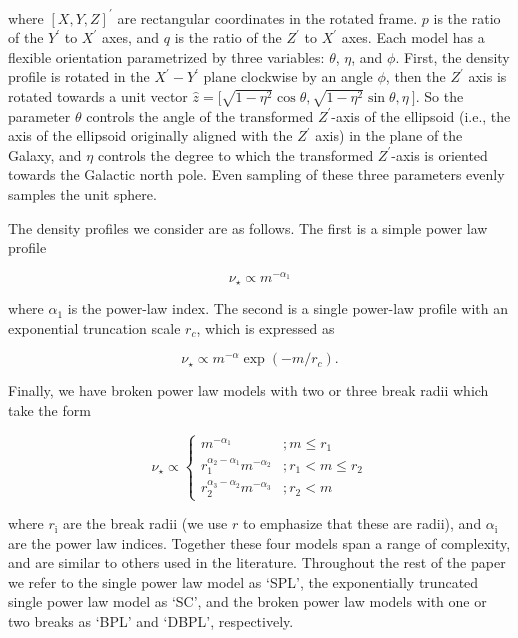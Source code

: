 \noindent where $[X,Y,Z]^{\prime}$ are rectangular coordinates in the rotated frame. $p$ is the ratio of the $Y^{\prime}$ to $X^{\prime}$ axes, and $q$ is the ratio of the $Z^{\prime}$ to $X^{\prime}$ axes. Each model has a flexible orientation parametrized by three variables: $\theta$, $\eta$, and $\phi$. First, the density profile is rotated in the $X^{\prime}-Y^{\prime}$ plane clockwise by an angle $\phi$, then the $Z^{\prime}$ axis is rotated towards a unit vector $\hat{z} = \big[ \sqrt{ 1-\eta^{2} } \cos\theta, \sqrt{ 1-\eta^{2} } \sin\theta, \eta \  \big]$. So the parameter $\theta$ controls the angle of the transformed $Z^{\prime}$-axis of the ellipsoid (i.e., the axis of the ellipsoid originally aligned with the $Z^{\prime}$ axis) in the plane of the Galaxy, and $\eta$ controls the degree to which the transformed $Z^{\prime}$-axis is oriented towards the Galactic north pole. Even sampling of these three parameters evenly samples the unit sphere. 

The density profiles we consider are as follows. The first is a simple power law profile

\begin{equation}
\label{eq:single-power-law}
\nu_{\star} \propto m^{-\alpha_{1}}
\end{equation}

\noindent where $\alpha_{1}$ is the power-law index. The second is a single power-law profile with an exponential truncation scale $r_{c}$, which is expressed as 

\begin{equation}
\label{eq:exp-truncated-power-law}
\nu_{\star} \propto m^{-\alpha} \exp(-m/r_{c}) .
\end{equation}

\noindent Finally, we have broken power law models with two or three break radii which take the form

\begin{equation}
\label{eq:broken-power-law}
\nu_{\star} \propto 
\begin{cases}
m^{-\alpha_{1}} & ; m \leq r_{1} \\
r_{1}^{\alpha_{2}-\alpha_{1}} m^{-\alpha_{2}} & ; r_{1} < m \leq r_{2} \\
r_{2}^{\alpha_{3}-\alpha_{2}} m^{-\alpha_{3}} & ; r_{2} < m
\end{cases}
\end{equation}


\noindent where $r_\mathrm{i}$ are the break radii (we use $r$ to emphasize that these are radii), and $\alpha_\mathrm{i}$ are the power law indices. Together these four models span a range of complexity, and are similar to others used in the literature. Throughout the rest of the paper we refer to the single power law model as `SPL', the exponentially truncated single power law model as `SC', and the broken power law models with one or two breaks as `BPL' and `DBPL', respectively.

